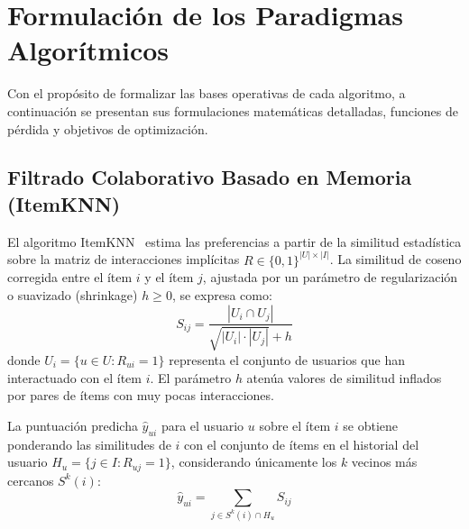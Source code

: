\documentclass[journal]{IEEEtran}
\begin{document}
\section{Formulación de los Paradigmas Algorítmicos}
\label{sec:paradigmas}

Con el propósito de formalizar las bases operativas de cada algoritmo, a continuación se presentan sus formulaciones matemáticas detalladas, funciones de pérdida y objetivos de optimización.

\subsection{Filtrado Colaborativo Basado en Memoria (ItemKNN)}
El algoritmo ItemKNN~\cite{sarwar2001item} estima las preferencias a partir de la similitud estadística sobre la matriz de interacciones implícitas $R \in \{0, 1\}^{|U| \times |I|}$. La similitud de coseno corregida entre el ítem $i$ y el ítem $j$, ajustada por un parámetro de regularización o suavizado (shrinkage) $h \ge 0$, se expresa como:
\begin{equation}
S_{ij} = \frac{|U_i \cap U_j|}{\sqrt{|U_i| \cdot |U_j|} + h}
\end{equation}
donde $U_i = \{u \in U : R_{ui} = 1\}$ representa el conjunto de usuarios que han interactuado con el ítem $i$. El parámetro $h$ atenúa valores de similitud inflados por pares de ítems con muy pocas interacciones.

La puntuación predicha $\hat{y}_{ui}$ para el usuario $u$ sobre el ítem $i$ se obtiene ponderando las similitudes de $i$ con el conjunto de ítems en el historial del usuario $H_u = \{j \in I : R_{uj} = 1\}$, considerando únicamente los $k$ vecinos más cercanos $S^k(i)$:
\begin{equation}
\hat{y}_{ui} = \sum_{j \in S^k(i) \cap H_u} S_{ij}
\end{equation}
\end{document}
